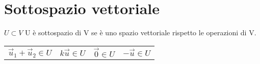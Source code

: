 \section{Sottospazio vettoriale}
$U \subset V$ \quad U è sottospazio di V se è uno spazio vettoriale rispetto le operazioni di V.

\begin{tabular}{llll}
	$\vec{u}_1 + \vec{u}_2 \in U$ &
	$k\vec{u} \in U$ &
	$\vec{0} \in U$ &
	$-\vec{u} \in U$ \\
\end{tabular}
